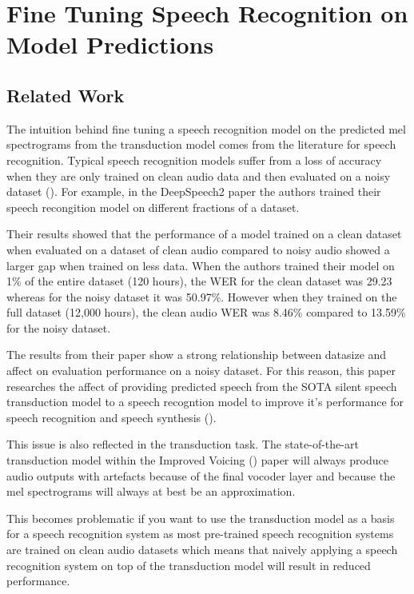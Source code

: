 \section{Fine Tuning Speech Recognition on Model Predictions}

\subsection{Related Work}

The intuition behind fine tuning a speech recognition model on the
predicted mel spectrograms from the transduction model comes
from the literature for speech recognition. Typical speech recognition models
suffer from a loss of accuracy when they are only trained on clean audio data
and then evaluated on a noisy dataset (\cite{DS2_original}). For example,
in the DeepSpeech2 paper the authors trained their speech recongition
model on different fractions of a dataset.

Their results showed that the
performance of a model trained on a clean dataset when evaluated on a dataset
of clean audio compared to noisy audio showed a larger gap when trained on less
data. When the authors trained their model on 1\% of the entire dataset (120 hours),
the WER for the clean dataset was 29.23 whereas for the noisy dataset it was 50.97\%.
However when they trained on the full dataset (12,000 hours), the clean audio
WER was 8.46\% compared to 13.59\% for the noisy dataset.

The results from their paper show a strong relationship between datasize and
affect on evaluation performance on a noisy dataset. For this reason, this paper
researches the affect of providing predicted speech from the SOTA silent speech
transduction model to a speech recogntion model to improve it's performance for
speech recognition and speech synthesis (\cite{DS2_original}).

This issue is also reflected in the transduction task. The state-of-the-art
transduction model within the Improved Voicing (\cite{gaddy2021improved}) paper
will always produce audio outputs with artefacts because of the final vocoder layer
and because the mel spectrograms will always at best be an approximation.

This becomes problematic if you want to use the transduction model as a basis for a
speech recognition system as most pre-trained speech recognition systems
are trained on clean audio datasets which means that naively applying a speech
recognition system on top of the transduction model will result in reduced performance.


